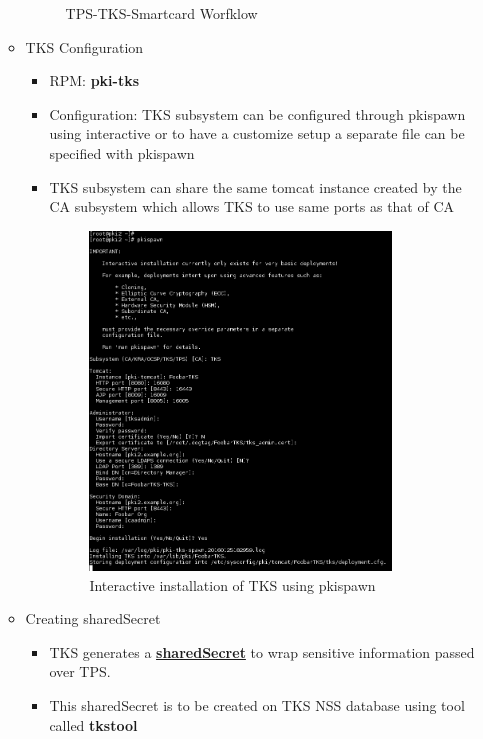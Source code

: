 \documentclass[a4paper]{article}
\begin{document}
\begin{itemize}
\begin{itemize}
\begin{figure}[H]
                            \caption{TPS-TKS-Smartcard Worfklow}
                        \end{figure}
                    \item TKS Configuration 
                        \begin{itemize}
                            \item RPM: \textbf{pki-tks}
                            \item Configuration: TKS subsystem can be configured through pkispawn using interactive or to have a 
                                customize setup a separate file can be specified with pkispawn
                            \item TKS subsystem can share the same tomcat instance created by the CA subsystem which allows 
                                TKS to use same ports as that of CA
                            \begin{figure}[H]
                                \centering
                                \includegraphics[width=80mm]{pkispawn-tks.png}
                                \caption{Interactive installation of TKS using pkispawn}
                            \end{figure}
                        \end{itemize}
                    \item Creating sharedSecret 
                        \begin{itemize}
                            \item TKS generates a \textbf{\underline{sharedSecret}} to wrap sensitive information passed over TPS.
                            \item This sharedSecret is to be created on TKS NSS database using tool called \textbf{tkstool}

\end{itemize}
\end{itemize}
\end{itemize}
\end{document}
